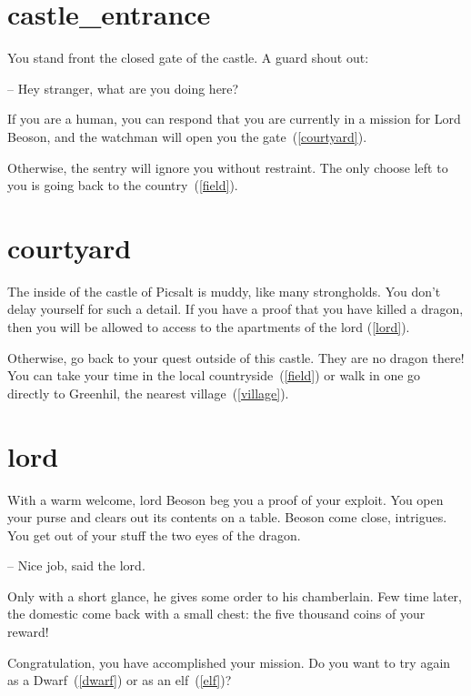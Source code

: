 \section{castle_entrance}

You stand front the closed gate of the castle. A guard shout out:

-- Hey stranger, what are you doing here?

If you are a human, you can respond that you are currently in a mission for Lord
Beoson, and the watchman will open you the gate~(\ref{courtyard}).

Otherwise, the sentry will ignore you without restraint. The only choose
left to you is going back to the country~(\ref{field}).

\section{courtyard}

The inside of the castle of Picsalt is muddy, like many strongholds. You don't
delay yourself for such a detail. If you have a proof that you have killed a
dragon, then you will be allowed to access to the apartments of the lord
(\ref{lord}).

Otherwise, go back to your quest outside of this castle. They are no dragon
there! You can take your time in the local countryside~(\ref{field}) or walk in
one go directly to Greenhil, the nearest village~(\ref{village}).

\section{lord}

With a warm welcome, lord Beoson beg you a proof of your exploit.  You open
your purse and clears out its contents on a table. Beoson come close,
intrigues. You get out of your stuff the two eyes of the dragon.

-- Nice job, said the lord.

Only with a short glance, he gives some order to his chamberlain. Few time
later, the domestic come back with a small chest: the five thousand coins of
your reward!

\medbreak

Congratulation, you have accomplished your mission. Do you want to try again as a
Dwarf~(\ref{dwarf}) or as an elf~(\ref{elf})?
